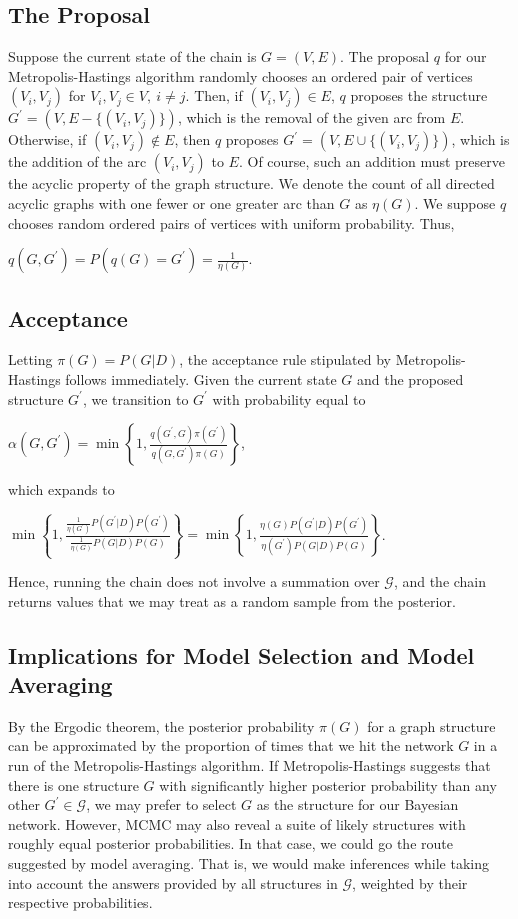 \documentclass[12pt,twoside]{reedthesis}
\begin{document}
		\subsection*{The Proposal}
			Suppose the current state of the chain is $G=(V,E)$. 
			The proposal $q$ for our Metropolis-Hastings algorithm randomly chooses an ordered pair of vertices $(V_i, V_j)$ for $V_i, V_j \in V, \ i \neq j$. 
			Then, if $(V_i, V_j) \in E$, $q$ proposes the structure $G^{'} = (V,E - \{(V_i,V_j)\})$, which is the removal of the given arc from $E$. 
			Otherwise, if $(V_i,V_j) \not\in E$, then $q$ proposes $G^{'} = (V, E \cup \{(V_i, V_j)\})$, which is the addition of the arc $(V_i, V_j)$ to $E$. Of course, such an addition must preserve the acyclic property of the graph structure. 
			We denote the count of all directed acyclic graphs with one fewer or one greater arc than $G$ as $\eta(G)$. 
			We suppose $q$ chooses random ordered pairs of vertices with uniform probability. Thus,
			\begin{center}
			$q(G,G^{'}) = P(q(G) = G^{'}) = \frac{1}{\eta(G)}$.
			\end{center}
		\subsection*{Acceptance}
			Letting $\pi(G) = P(G|D)$,
			the acceptance rule stipulated by Metropolis-Hastings follows immediately. 
			Given the current state $G$ and the proposed structure $G^{'}$, 
			we transition to $G^{'}$ with probability equal to
			\begin{center}
				$
				\alpha(G,G^{'}) = 
				\displaystyle \min \left\{ 1, \frac{q(G^{'}, G)\pi(G^{'})}{q(G, G^{'})\pi(G)}  \right\}
				$,
			\end{center}
				which expands to
			\begin{center}
				$
				\displaystyle \min \left\{ 1, \frac{\frac{1}{\eta(G^{'})}P(G^{'} | D)P(G^{'})}{\frac{1}{\eta(G)}P(G|D)P(G)} \right\} =
				\displaystyle \min \left\{ 1, \frac{\eta(G)P(G^{'} | D)P(G^{'})}{\eta(G^{'})P(G|D)P(G)} \right\}				
				$.
			\end{center}
			Hence, running the chain does not involve a summation over $\mathcal G$, 
			and the chain returns values that we may treat as a random sample from the posterior.
		\subsection*{Implications for Model Selection and Model Averaging}
			By the Ergodic theorem, the posterior probability $\pi(G)$ for a graph structure can be approximated by the proportion of times that we hit the network $G$ in a run of the Metropolis-Hastings algorithm. If Metropolis-Hastings suggests that there is one structure $G$ with significantly higher posterior probability than any other $G^{'} \in \mathcal G$, we may prefer to select $G$ as the structure for our Bayesian network. However, MCMC may also reveal a suite of likely structures with roughly equal posterior probabilities. In that case, we could go the route suggested by model averaging. That is, we would make inferences while taking into account the answers provided by all structures in $\mathcal G$, weighted by their respective probabilities.
\end{document}
